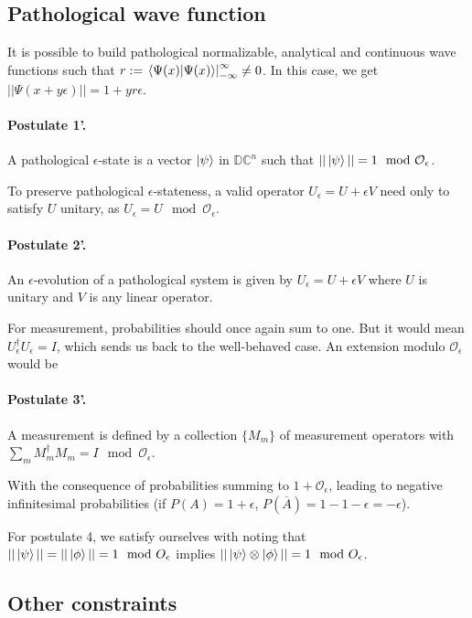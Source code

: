 \documentclass{article}
\newcommand{\DC}{\mathbb{DC}}
\newcommand{\Z}{\mathcal{O}_\e}
\newcommand{\e}{\epsilon}
\renewcommand{\bar}{\overline}
\begin{document}
\subsection{Pathological wave function}

It is possible to build pathological normalizable, analytical and continuous wave functions such that $r := \left. \braket{\Psi(x)|\Psi(x)} \right|_{-\infty}^\infty \neq 0$. In this case, we get $||\Psi(x + y \e)|| = 1 + y r \e$.

\paragraph{Postulate 1'.} A pathological $\e$-state is a vector $\ket\psi$ in $\DC^n$ such that $||\ket\psi|| = 1 \mod \Z$.

To preserve pathological $\e$-stateness, a valid operator $U_\e = U + \e V$ need only to satisfy $U$ unitary, as $U_\e = U \mod \Z$.

\paragraph{Postulate 2'.} An $\e$-evolution of a pathological system is given by $U_\e = U + \e V$ where $U$ is unitary and $V$ is any linear operator.

For measurement, probabilities should once again sum to one. But it would mean $U_\e^\dagger U_\e = I$, which sends us back to the well-behaved case. An extension modulo $\Z$ would be

\paragraph{Postulate 3'.} A measurement is defined by a collection $\{M_m\}$ of measurement operators with $\sum_m M_m^\dagger M_m = I \mod \Z$.

With the consequence of probabilities summing to $1 + \Z$, leading to negative infinitesimal probabilities (if $P(A) = 1 + \e$, $P(\bar{A}) = 1 - 1 - \e = -\e$).

For postulate 4, we satisfy ourselves with noting that $||\ket\psi|| = ||\ket\phi|| = 1 \mod O_\e$ implies $||\ket\psi \otimes \ket\phi|| = 1 \mod O_\e$.

\subsection{Other constraints}



\end{document}
